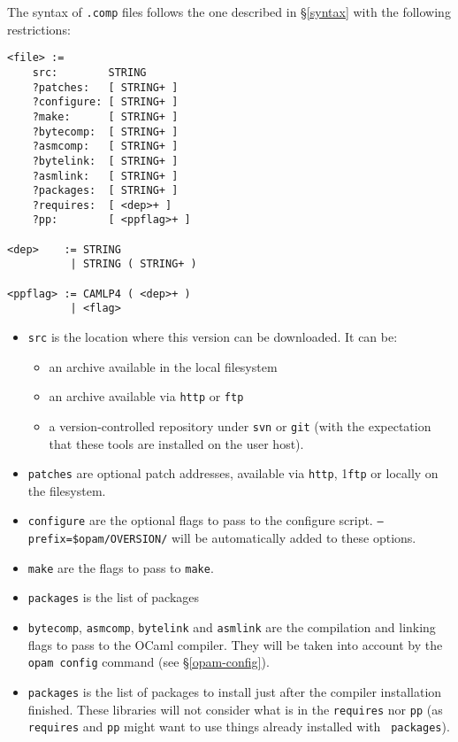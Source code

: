 \documentclass[a4paper,11pt]{article}
\begin{document}
The syntax of {\tt .comp} files follows the one described in
\S\ref{syntax} with the following restrictions:

{
\begin{Verbatim}[frame=single]
<file> :=
    src:        STRING
    ?patches:   [ STRING+ ]
    ?configure: [ STRING+ ]
    ?make:      [ STRING+ ]
    ?bytecomp:  [ STRING+ ]
    ?asmcomp:   [ STRING+ ]
    ?bytelink:  [ STRING+ ]
    ?asmlink:   [ STRING+ ]
    ?packages:  [ STRING+ ]
    ?requires:  [ <dep>+ ]
    ?pp:        [ <ppflag>+ ]

<dep>    := STRING
          | STRING ( STRING+ )

<ppflag> := CAMLP4 ( <dep>+ )
          | <flag>
\end{Verbatim}
}
\begin{itemize}

\item {\tt src} is the location where this version can be downloaded. It can be:
\begin{itemize}
\item an archive available in the local filesystem
\item an archive available via {\tt http} or {\tt ftp}
\item a version-controlled repository under {\tt svn} or {\tt git}
  (with the expectation that these tools are installed on the user host).
\end{itemize}

\item {\tt patches} are optional patch addresses, available via {\tt http}, 1{\tt ftp}
  or locally on the filesystem.

\item {\tt configure} are the optional flags to pass to the configure
  script. {\tt --prefix=\$opam/OVERSION/} will be automatically added
  to these options.

\item {\tt make} are the flags to pass to {\tt make}.

\item {\tt packages} is the list of packages

\item {\tt bytecomp}, {\tt asmcomp}, {\tt bytelink} and {\tt asmlink}
  are the compilation and linking flags to pass to the OCaml
  compiler. They will be taken into account by the \verb+opam config+
  command (see \S\ref{opam-config}).

\item {\tt packages} is the list of packages to install just after the
  compiler installation finished. These libraries will not consider
  what is in the {\tt requires} nor {\tt pp} (as {\tt requires} and
  {\tt pp} might want to use things already installed with {\tt
    packages}).


\end{itemize}
\end{document}
